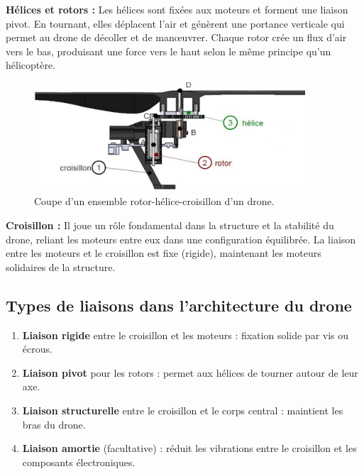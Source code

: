 \documentclass[a4paper,12pt]{report}
\begin{document}
\textbf{Hélices et rotors :} Les hélices sont fixées aux moteurs et forment une liaison pivot. En tournant, elles déplacent l'air et génèrent une portance verticale qui permet au drone de décoller et de manœuvrer. Chaque rotor crée un flux d'air vers le bas, produisant une force vers le haut selon le même principe qu'un hélicoptère.

\begin{figure}[H]
    \centering
    \includegraphics[width=0.9\textwidth]{images/coupe_rotor_croisillon.png}
    \caption{Coupe d'un ensemble rotor-hélice-croisillon d'un drone.}
    \label{fig:coupe_rotor_croisillon}
\end{figure}

\textbf{Croisillon :} Il joue un rôle fondamental dans la structure et la stabilité du drone, reliant les moteurs entre eux dans une configuration équilibrée. La liaison entre les moteurs et le croisillon est fixe (rigide), maintenant les moteurs solidaires de la structure.

\subsection*{Types de liaisons dans l'architecture du drone}
\begin{enumerate}
    \item \textbf{Liaison rigide} entre le croisillon et les moteurs : fixation solide par vis ou écrous.
    \item \textbf{Liaison pivot} pour les rotors : permet aux hélices de tourner autour de leur axe.
    \item \textbf{Liaison structurelle} entre le croisillon et le corps central : maintient les bras du drone.
    \item \textbf{Liaison amortie} (facultative) : réduit les vibrations entre le croisillon et les composants électroniques.
\end{enumerate}
\end{document}
